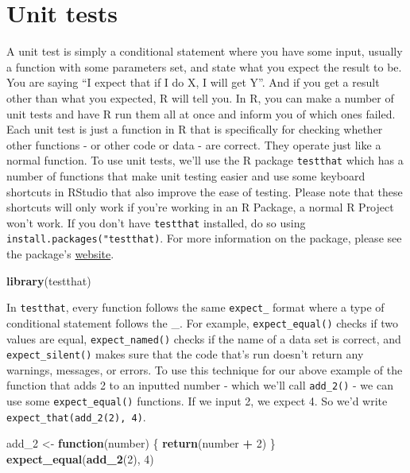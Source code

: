 \documentclass[
  12pt,
]{book}
\newenvironment{Shaded}{\begin{snugshade}}{\end{snugshade}}
\newcommand{\ControlFlowTok}[1]{\textcolor[rgb]{0.27,0.27,0.27}{\textbf{#1}}}
\newcommand{\DecValTok}[1]{\textcolor[rgb]{0.06,0.06,0.06}{#1}}
\newcommand{\KeywordTok}[1]{\textcolor[rgb]{0.27,0.27,0.27}{\textbf{#1}}}
\newcommand{\NormalTok}[1]{#1}
\newcommand{\OperatorTok}[1]{\textcolor[rgb]{0.43,0.43,0.43}{\textbf{#1}}}
\newcommand{\StringTok}[1]{\textcolor[rgb]{0.5,0.5,0.5}{#1}}
\begin{document}
\hypertarget{unit-tests}{%
\section{Unit tests}\label{unit-tests}}

A unit test is simply a conditional statement where you have some input, usually a function with some parameters set, and state what you expect the result to be. You are saying ``I expect that if I do X, I will get Y''. And if you get a result other than what you expected, R will tell you. In R, you can make a number of unit tests and have R run them all at once and inform you of which ones failed. Each unit test is just a function in R that is specifically for checking whether other functions - or other code or data - are correct. They operate just like a normal function. To use unit tests, we'll use the R package \texttt{testthat} which has a number of functions that make unit testing easier and use some keyboard shortcuts in RStudio that also improve the ease of testing. Please note that these shortcuts will only work if you're working in an R Package, a normal R Project won't work. If you don't have \texttt{testthat} installed, do so using \texttt{install.packages("testthat)}. For more information on the package, please see the package's \href{https://testthat.r-lib.org/index.html}{website}.

\begin{Shaded}
\begin{Highlighting}[]
\KeywordTok{library}\NormalTok{(testthat)}
\end{Highlighting}
\end{Shaded}

In \texttt{testthat}, every function follows the same \texttt{expect\_} format where a type of conditional statement follows the \_. For example, \texttt{expect\_equal()} checks if two values are equal, \texttt{expect\_named()} checks if the name of a data set is correct, and \texttt{expect\_silent()} makes sure that the code that's run doesn't return any warnings, messages, or errors. To use this technique for our above example of the function that adds 2 to an inputted number - which we'll call \texttt{add\_2()} - we can use some \texttt{expect\_equal()} functions. If we input 2, we expect 4. So we'd write \texttt{expect\_that(add\_2(2),\ 4)}.

\begin{Shaded}
\begin{Highlighting}[]
\NormalTok{add\_}\DecValTok{2}\NormalTok{ <{-}}\StringTok{ }\ControlFlowTok{function}\NormalTok{(number) \{ }\KeywordTok{return}\NormalTok{(number }\OperatorTok{+}\StringTok{ }\DecValTok{2}\NormalTok{) \}}
\KeywordTok{expect\_equal}\NormalTok{(}\KeywordTok{add\_2}\NormalTok{(}\DecValTok{2}\NormalTok{), }\DecValTok{4}\NormalTok{)}
\end{Highlighting}
\end{Shaded}
\end{document}
